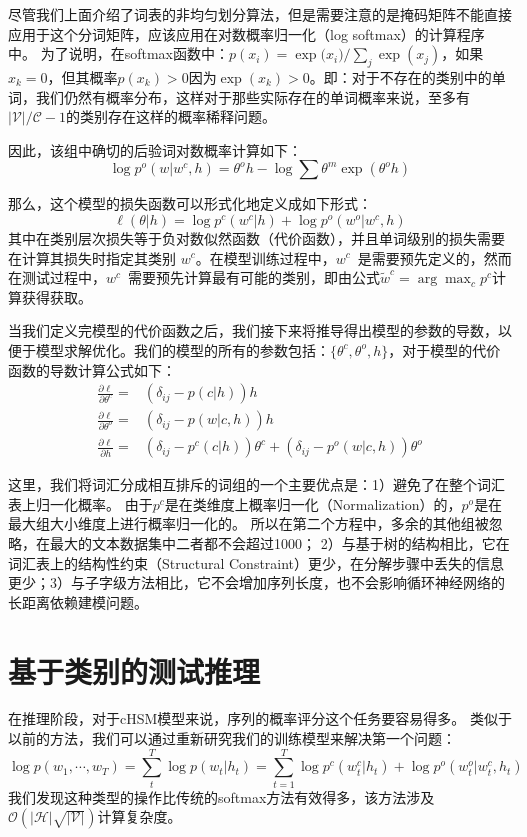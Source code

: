 尽管我们上面介绍了词表的非均匀划分算法，但是需要注意的是掩码矩阵不能直接应用于这个分词矩阵，应该应用在对数概率归一化（log softmax）的计算程序中。 为了说明，在softmax函数中：$ p(x_i)= {\exp({x_i}})/ {\sum_j \exp(x_j)} $，如果$ x_k = 0 $，但其概率$ p(x_k)> 0$因为$\exp(x_k)> 0 $。即：对于不存在的类别中的单词，我们仍然有概率分布，这样对于那些实际存在的单词概率来说，至多有$\mathcal{|V|/\mathcal{C}}-1$的类别存在这样的概率稀释问题。

 因此，该组中确切的后验词对数概率计算如下：
\begin{equation}
  \log p^o(w|w^c,h)=\theta^o h -\log\sum\theta^m\exp(\theta^o h)
\end{equation}

那么，这个模型的损失函数可以形式化地定义成如下形式：
\begin{equation}
\ell(\theta|h) =\log p^c(w^c|h) +\log p^o(w^o|w^c,h)
\end{equation}
其中在类别层次损失等于负对数似然函数（代价函数），并且单词级别的损失需要在计算其损失时指定其类别 $ w ^ c $。在模型训练过程中，$ w^c$~是需要预先定义的，然而在测试过程中，$w^c$~需要预先计算最有可能的类别，即由公式$\tilde w^c=\arg\max_c p^c$计算获得获取。

当我们定义完模型的代价函数之后，我们接下来将推导得出模型的参数的导数，以便于模型求解优化。我们的模型的所有的参数包括：$\{\theta^c,\theta^o,h\}$，对于模型的代价函数的导数计算公式如下：
\begin{equation}
\begin{split}
\frac{\partial \ell}{\partial \theta^c}=& (\delta_{ij}-p(c|h))h \\
\frac{\partial \ell}{\partial \theta^o}=&(\delta_{ij}-p(w|c,h))h \\
\frac{\partial \ell}{\partial h}=&(\delta_{ij}-p^c(c|h))\theta^c + (\delta_{ij}-p^o(w|c,h))\theta^o
\end{split}
\end{equation}

这里，我们将词汇分成相互排斥的词组的一个主要优点是：1）避免了在整个词汇表上归一化概率。 由于$p^c$是在类维度上概率归一化（Normalization）的，$p^o$是在最大组大小维度上进行概率归一化的。 所以在第二个方程中，多余的其他组被忽略，在最大的文本数据集中二者都不会超过1000； 2）与基于树的结构相比，它在词汇表上的结构性约束（Structural Constraint）更少，在分解步骤中丢失的信息更少；3）与子字级方法相比，它不会增加序列长度，也不会影响循环神经网络的长距离依赖建模问题。



\section{基于类别的测试推理}
在推理阶段，对于cHSM模型来说，序列的概率评分这个任务要容易得多。
类似于以前的方法，我们可以通过重新研究我们的训练模型来解决第一个问题：
\begin{equation}\label{equ:class_inf}
\log p(w_1,\cdots, w_T)=\sum_t^T\log p(w_t|h_t) =\sum_{t=1}^{T}\log p^c(w^c_t|h_t) +\log p^o(w^o_t|w^c_t,h_t)
\end{equation}
我们发现这种类型的操作比传统的softmax方法有效得多，该方法涉及$ \mathcal{O(|H|\sqrt{|\mathcal{V}|})}$计算复杂度。

